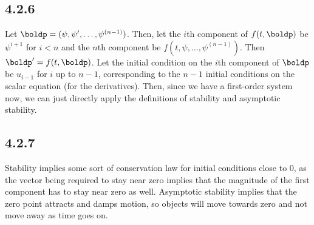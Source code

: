 \documentclass{article}
\begin{document}
\subsection*{4.2.6}
Let $\boldp=(\psi,\psi',\ldots,\psi^{(n-1)})$. Then, let the $i$th component of $f(t,\boldp)$ be $\psi^{i+1}$ for $i<n$ and the $n$th component be $f(t,\psi,\ldots,\psi^{(n-1)})$. Then $\boldp'=f(t,\boldp)$. Let the initial condition on the $i$th component of $\boldp$ be $u_{i-1}$ for $i$ up to $n-1$, corresponding to the $n-1$ initial conditions on the scalar equation (for the derivatives). Then, since we have a first-order system now, we can just directly apply the definitions of stability and asymptotic stability. 
\subsection*{4.2.7}
Stability implies some sort of conservation law for initial conditions close to $0$, as the vector being required to stay near zero implies that the magnitude of the first component has to stay near zero as well. Asymptotic stability implies that the zero point attracts and damps motion, so objects will move towards zero and not move away as time goes on.
\end{document}

